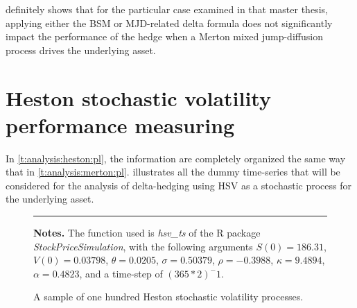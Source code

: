 \documentclass[12pt]{report}
\begin{document}
 definitely shows that for the particular case examined in that master thesis, applying either the BSM or MJD-related delta formula does not significantly impact the performance of the hedge when a Merton mixed jump-diffusion process drives the underlying asset.



















































\section{Heston stochastic volatility performance measuring}
\label{sec:section name}


In \cref{t:analysis:heston:pl}, the information are completely organized the same way that in \cref{t:analysis:merton:pl}. 
 illustrates all the dummy time-series that will be considered for the analysis of delta-hedging using HSV as a stochastic process for the underlying asset.


\begin{figure}[ht]
  \centering
  \rule{40mm}{20mm}
  \caption{A sample of one hundred Heston stochastic volatility processes.}
  \begin{changemargin}{0.5cm}{0.5cm}
  \medskip
\footnotesize
{}\textbf{Notes.} The function used is \textit{hsv\_ts} of the R package \textit{StockPriceSimulation}, with the following arguments $S(0) = 186.31$,  $V(0) = 0.03798$, $\theta = 0.0205$, $\sigma = 0.50379$, $\rho = -0.3988$,  $\kappa = 9.4894$, $\alpha  = 0.4823$, and a time-step of $(365 * 2)^-1$.
  \end{changemargin}
  \label{p:analysis:hsv:100}
\end{figure}
\end{document}
